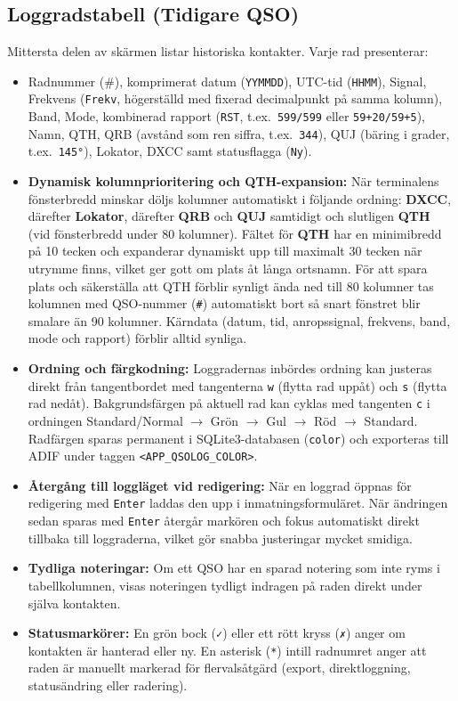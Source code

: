 \documentclass[11pt,a4paper]{article}
\begin{document}
\subsection{Loggradstabell (Tidigare QSO)}
Mittersta delen av skärmen listar historiska kontakter. Varje rad presenterar:
\begin{itemize}
    \item Radnummer (\#), komprimerat datum (\texttt{YYMMDD}), UTC-tid (\texttt{HHMM}), Signal, Frekvens (\texttt{Frekv}, högerställd med fixerad decimalpunkt på samma kolumn), Band, Mode, kombinerad rapport (\texttt{RST}, t.ex.\ \texttt{599/599} eller \texttt{59+20/59+5}), Namn, QTH, QRB (avstånd som ren siffra, t.ex.\ \texttt{344}), QUJ (bäring i grader, t.ex.\ \texttt{145°}), Lokator, DXCC samt statusflagga (\texttt{Ny}).
    \item \textbf{Dynamisk kolumnprioritering och QTH-expansion:} När terminalens fönsterbredd minskar döljs kolumner automatiskt i följande ordning: \textbf{DXCC}, därefter \textbf{Lokator}, därefter \textbf{QRB} och \textbf{QUJ} samtidigt och slutligen \textbf{QTH} (vid fönsterbredd under 80 kolumner). Fältet för \textbf{QTH} har en minimibredd på 10 tecken och expanderar dynamiskt upp till maximalt 30 tecken när utrymme finns, vilket ger gott om plats åt långa ortsnamn. För att spara plats och säkerställa att QTH förblir synligt ända ned till 80 kolumner tas kolumnen med QSO-nummer (\texttt{\#}) automatiskt bort så snart fönstret blir smalare än 90 kolumner. Kärndata (datum, tid, anropssignal, frekvens, band, mode och rapport) förblir alltid synliga.
    \item \textbf{Ordning och färgkodning:} Loggradernas inbördes ordning kan justeras direkt från tangentbordet med tangenterna \texttt{w} (flytta rad uppåt) och \texttt{s} (flytta rad nedåt). Bakgrundsfärgen på aktuell rad kan cyklas med tangenten \texttt{c} i ordningen Standard/Normal $\rightarrow$ Grön $\rightarrow$ Gul $\rightarrow$ Röd $\rightarrow$ Standard. Radfärgen sparas permanent i SQLite3-databasen (\texttt{color}) och exporteras till ADIF under taggen \texttt{<APP\_QSOLOG\_COLOR>}.
    \item \textbf{Återgång till loggläget vid redigering:} När en loggrad öppnas för redigering med \texttt{Enter} laddas den upp i inmatningsformuläret. När ändringen sedan sparas med \texttt{Enter} återgår markören och fokus automatiskt direkt tillbaka till loggraderna, vilket gör snabba justeringar mycket smidiga.
    \item \textbf{Tydliga noteringar:} Om ett QSO har en sparad notering som inte ryms i tabellkolumnen, visas noteringen tydligt indragen på raden direkt under själva kontakten.
    \item \textbf{Statusmarkörer:} En grön bock (\texttt{✓}) eller ett rött kryss (\texttt{✗}) anger om kontakten är hanterad eller ny. En asterisk (\texttt{*}) intill radnumret anger att raden är manuellt markerad för flervalsåtgärd (export, direktloggning, statusändring eller radering).
\end{itemize}
\end{document}
